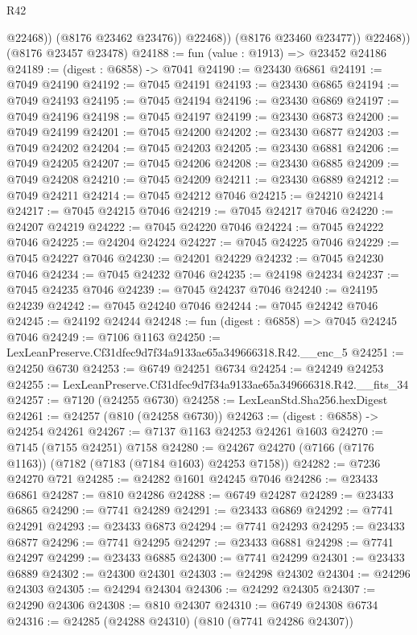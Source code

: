 \begin{lexlean}{R42}
\begin{coremodule}
{                    @22468))
                (@8176 @23462 @23476))
              @22468))
          (@8176 @23460 @23477))
        @22468))
    (@8176 @23457 @23478)
@24188 := fun (value : @1913) => @23452 @24186
@24189 := (digest : @6858) -> @7041
@24190 := @23430 @6861
@24191 := @7049 @24190
@24192 := @7045 @24191
@24193 := @23430 @6865
@24194 := @7049 @24193
@24195 := @7045 @24194
@24196 := @23430 @6869
@24197 := @7049 @24196
@24198 := @7045 @24197
@24199 := @23430 @6873
@24200 := @7049 @24199
@24201 := @7045 @24200
@24202 := @23430 @6877
@24203 := @7049 @24202
@24204 := @7045 @24203
@24205 := @23430 @6881
@24206 := @7049 @24205
@24207 := @7045 @24206
@24208 := @23430 @6885
@24209 := @7049 @24208
@24210 := @7045 @24209
@24211 := @23430 @6889
@24212 := @7049 @24211
@24214 := @7045 @24212 @7046
@24215 := @24210 @24214
@24217 := @7045 @24215 @7046
@24219 := @7045 @24217 @7046
@24220 := @24207 @24219
@24222 := @7045 @24220 @7046
@24224 := @7045 @24222 @7046
@24225 := @24204 @24224
@24227 := @7045 @24225 @7046
@24229 := @7045 @24227 @7046
@24230 := @24201 @24229
@24232 := @7045 @24230 @7046
@24234 := @7045 @24232 @7046
@24235 := @24198 @24234
@24237 := @7045 @24235 @7046
@24239 := @7045 @24237 @7046
@24240 := @24195 @24239
@24242 := @7045 @24240 @7046
@24244 := @7045 @24242 @7046
@24245 := @24192 @24244
@24248 := fun (digest : @6858) => @7045 @24245 @7046
@24249 := @7106 @1163
@24250 := LexLeanPreserve.Cf31dfec9d7f34a9133ae65a349666318.R42.__enc_5
@24251 := @24250 @6730
@24253 := @6749 @24251 @6734
@24254 := @24249 @24253
@24255 := LexLeanPreserve.Cf31dfec9d7f34a9133ae65a349666318.R42.__fits_34
@24257 := @7120 (@24255 @6730)
@24258 := LexLeanStd.Sha256.hexDigest
@24261 := @24257 (@810 (@24258 @6730))
@24263 := (digest : @6858) -> @24254 @24261
@24267 := @7137 @1163 @24253 @24261 @1603
@24270 := @7145 (@7155 @24251) @7158
@24280 := @24267 @24270 (@7166 (@7176 @1163)) (@7182 (@7183 (@7184 @1603) @24253 @7158))
@24282 := @7236 @24270 @721
@24285 := @24282 @1601 @24245 @7046
@24286 := @23433 @6861
@24287 := @810 @24286
@24288 := @6749 @24287
@24289 := @23433 @6865
@24290 := @7741 @24289
@24291 := @23433 @6869
@24292 := @7741 @24291
@24293 := @23433 @6873
@24294 := @7741 @24293
@24295 := @23433 @6877
@24296 := @7741 @24295
@24297 := @23433 @6881
@24298 := @7741 @24297
@24299 := @23433 @6885
@24300 := @7741 @24299
@24301 := @23433 @6889
@24302 := @24300 @24301
@24303 := @24298 @24302
@24304 := @24296 @24303
@24305 := @24294 @24304
@24306 := @24292 @24305
@24307 := @24290 @24306
@24308 := @810 @24307
@24310 := @6749 @24308 @6734
@24316 := @24285 (@24288 @24310) (@810 (@7741 @24286 @24307))
}
\end{coremodule}
\end{lexlean}
